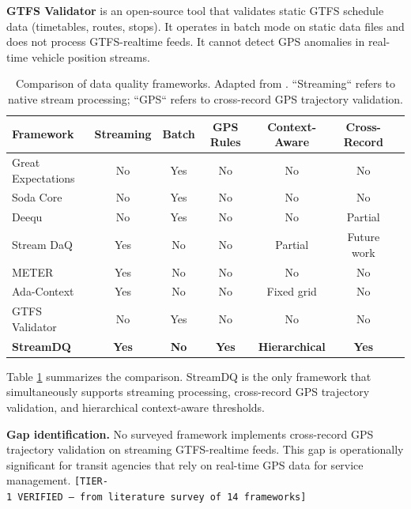\textbf{GTFS Validator} \citep{gtfs_validator} is an open-source tool that
validates static GTFS schedule data (timetables, routes, stops). It operates
in batch mode on static data files and does not process GTFS-realtime
feeds. It cannot detect GPS anomalies in real-time vehicle position streams.

\begin{table}[htbp]
  \centering
  \caption{Comparison of data quality frameworks. Adapted from
    \citep{streamdaq2025,meter2024,adacontext2025,deequ2018}.
    ``Streaming`` refers to native stream processing; ``GPS`` refers to
    cross-record GPS trajectory validation.}
  \label{tab:dq-framework-comparison}
  \begin{tabular}{lcccccc}
    \toprule
    Framework           & Streaming & Batch & GPS Rules & Context-Aware & Cross-Record \\
    \midrule
    Great Expectations & No        & Yes   & No       & No            & No           \\
    Soda Core          & No        & Yes   & No       & No            & No           \\
    Deequ              & No        & Yes   & No       & No            & Partial      \\
    Stream DaQ         & Yes       & No    & No       & Partial       & Future work  \\
    METER              & Yes       & No    & No       & No            & No           \\
    Ada-Context        & Yes       & No    & No       & Fixed grid    & No           \\
    GTFS Validator     & No        & Yes   & No       & No            & No           \\
    \textbf{StreamDQ} & \textbf{Yes} & \textbf{No} & \textbf{Yes} & \textbf{Hierarchical} & \textbf{Yes} \\
    \bottomrule
  \end{tabular}
\end{table}

Table \ref{tab:dq-framework-comparison} summarizes the comparison.
StreamDQ is the only framework that simultaneously supports streaming processing,
cross-record GPS trajectory validation, and hierarchical context-aware thresholds.

\textbf{Gap identification.} No surveyed framework implements cross-record
GPS trajectory validation on streaming GTFS-realtime feeds. This gap is
operationally significant for transit agencies that rely on real-time GPS data
for service management.
\texttt{[TIER-1\ VERIFIED\ —\ from\ literature\ survey\ of\ 14\ frameworks]}

